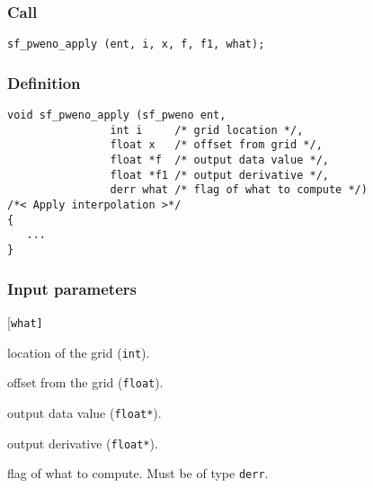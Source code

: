\subsubsection*{Call}
\begin{verbatim}sf_pweno_apply (ent, i, x, f, f1, what);\end{verbatim}

\subsubsection*{Definition}
\begin{verbatim}
void sf_pweno_apply (sf_pweno ent, 
                int i     /* grid location */, 
                float x   /* offset from grid */, 
                float *f  /* output data value */, 
                float *f1 /* output derivative */, 
                derr what /* flag of what to compute */) 
/*< Apply interpolation >*/
{
   ...
}
\end{verbatim}

\subsubsection*{Input parameters}
\begin{desclist}{\tt }{\quad}[\tt what]
   \setlength\itemsep{0pt}
   \item[i]    location of the grid (\texttt{int}).  
   \item[x]    offset from the grid (\texttt{float}). 
   \item[f]    output data value (\texttt{float*}).  
   \item[f1]   output derivative (\texttt{float*}).  
   \item[what] flag of what to compute. Must be of type \texttt{derr}.  
\end{desclist}





